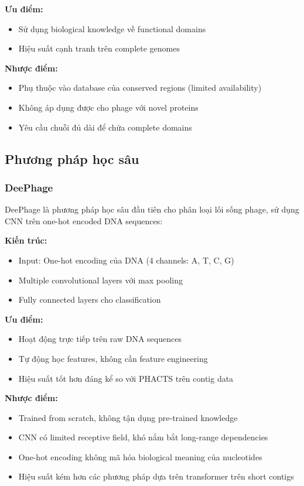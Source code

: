 \textbf{Ưu điểm:}
\begin{itemize}
    \item Sử dụng biological knowledge về functional domains
    \item Hiệu suất cạnh tranh trên complete genomes
\end{itemize}

\textbf{Nhược điểm:}
\begin{itemize}
    \item Phụ thuộc vào database của conserved regions (limited availability)
    \item Không áp dụng được cho phage với novel proteins
    \item Yêu cầu chuỗi đủ dài để chứa complete domains
\end{itemize}

\subsection{Phương pháp học sâu}

\subsubsection{DeePhage}

DeePhage \cite{wu2021deephage} là phương pháp học sâu đầu tiên cho phân loại lối sống phage, sử dụng CNN trên one-hot encoded DNA sequences:

\textbf{Kiến trúc:}
\begin{itemize}
    \item Input: One-hot encoding của DNA (4 channels: A, T, C, G)
    \item Multiple convolutional layers với max pooling
    \item Fully connected layers cho classification
\end{itemize}

\textbf{Ưu điểm:}
\begin{itemize}
    \item Hoạt động trực tiếp trên raw DNA sequences
    \item Tự động học features, không cần feature engineering
    \item Hiệu suất tốt hơn đáng kể so với PHACTS trên contig data
\end{itemize}

\textbf{Nhược điểm:}
\begin{itemize}
    \item Trained from scratch, không tận dụng pre-trained knowledge
    \item CNN có limited receptive field, khó nắm bắt long-range dependencies
    \item One-hot encoding không mã hóa biological meaning của nucleotides
    \item Hiệu suất kém hơn các phương pháp dựa trên transformer trên short contigs
\end{itemize}

